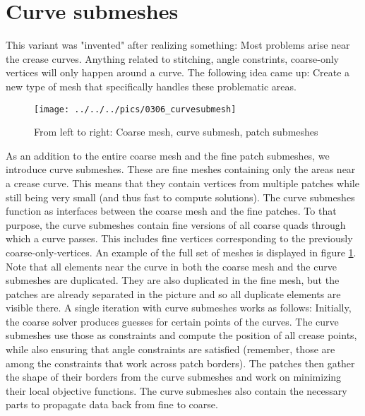 \documentclass[a4paper,twoside,12pt,nochapterprefix]{scrbook}
\begin{document}
\section{Curve submeshes}\label{sec:curve_submeshes}
This variant was "invented" after realizing something: Most problems arise near the crease curves. Anything related to stitching, angle constrints, coarse-only vertices will only happen around a curve. The following idea came up: Create a new type of mesh that specifically handles these problematic areas.\newline
\begin{figure}
    \centering
    \texttt{[image: ../../../pics/0306\_curvesubmesh]}
    \caption{From left to right: Coarse mesh, curve submesh, patch submeshes}
      \label{fig:curve_submesh}
\end{figure}
As an addition to the entire coarse mesh and the fine patch submeshes, we introduce curve submeshes. These are fine meshes containing only the areas near a crease curve. This means that they contain vertices from multiple patches while still being very small (and thus fast to compute solutions). The curve submeshes function as interfaces between the coarse mesh and the fine patches. To that purpose, the curve submeshes contain fine versions of all coarse quads through which a curve passes. This includes fine vertices corresponding to the previously coarse-only-vertices. An example of the full set of meshes is displayed in figure \ref{fig:curve_submesh}. Note that all elements near the curve in both the coarse mesh and the curve submeshes are duplicated. They are also duplicated in the fine mesh, but the patches are already separated in the picture and so all duplicate elements are visible there.\newline
A single iteration with curve submeshes works as follows: Initially, the coarse solver produces guesses for certain points of the curves. The curve submeshes use those as constraints and compute the position of all crease points, while also ensuring that angle constraints are satisfied (remember, those are among the constraints that work across patch borders). The patches then gather the shape of their borders from the curve submeshes and work on minimizing their local objective functions. The curve submeshes also contain the necessary parts to propagate data back from fine to coarse.\newline
\end{document}
